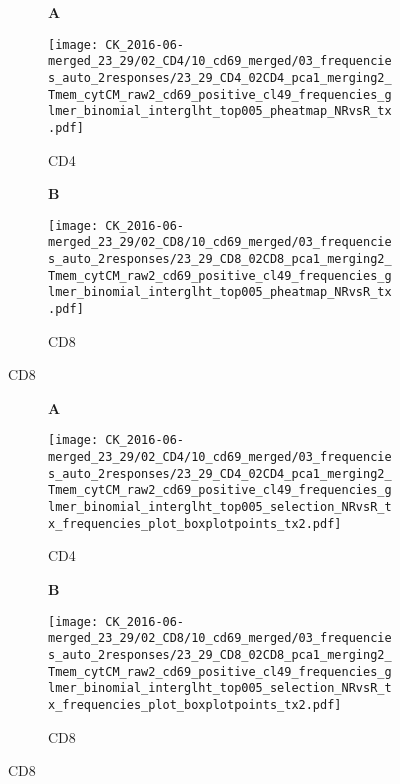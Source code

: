 \documentclass[a4paper, 12pt]{article}
\begin{document}
\clearpage

\begin{figure}[!thb]
\centering
    \caption{Significant cytokine combinations for TX (adjusted p-value $<$ 0.05)}
    \begin{subfigure}[t]{0.02\textwidth}
    \vskip 0pt
        \textbf{\textsf{\normalsize A}}
    \end{subfigure}
    \begin{subfigure}[t]{0.45\textwidth}
    \vskip 0pt
    \caption{CD4}
        \texttt{[image: CK\_2016-06-merged\_23\_29/02\_CD4/10\_cd69\_merged/03\_frequencies\_auto\_2responses/23\_29\_CD4\_02CD4\_pca1\_merging2\_Tmem\_cytCM\_raw2\_cd69\_positive\_cl49\_frequencies\_glmer\_binomial\_interglht\_top005\_pheatmap\_NRvsR\_tx.pdf]}
    \end{subfigure}
\quad
    \begin{subfigure}[t]{0.02\textwidth}
    \vskip 0pt
        \textbf{\textsf{\normalsize B}}
    \end{subfigure}
    \begin{subfigure}[t]{0.45\textwidth}
    \vskip 0pt
    \caption{CD8}
        \texttt{[image: CK\_2016-06-merged\_23\_29/02\_CD8/10\_cd69\_merged/03\_frequencies\_auto\_2responses/23\_29\_CD8\_02CD8\_pca1\_merging2\_Tmem\_cytCM\_raw2\_cd69\_positive\_cl49\_frequencies\_glmer\_binomial\_interglht\_top005\_pheatmap\_NRvsR\_tx.pdf]}
    \end{subfigure}
    
    
\end{figure}


\begin{figure}[!thb]
\centering

    \caption{}
    \begin{subfigure}[t]{0.02\textwidth}
    \vskip 0pt
        \textbf{\textsf{\normalsize A}}
    \end{subfigure}
    \begin{subfigure}[t]{0.45\textwidth}
    \vskip 0pt
    \caption{CD4}
        \texttt{[image: CK\_2016-06-merged\_23\_29/02\_CD4/10\_cd69\_merged/03\_frequencies\_auto\_2responses/23\_29\_CD4\_02CD4\_pca1\_merging2\_Tmem\_cytCM\_raw2\_cd69\_positive\_cl49\_frequencies\_glmer\_binomial\_interglht\_top005\_selection\_NRvsR\_tx\_frequencies\_plot\_boxplotpoints\_tx2.pdf]}
    \end{subfigure}
\quad
    \begin{subfigure}[t]{0.02\textwidth}
    \vskip 0pt
        \textbf{\textsf{\normalsize B}}
    \end{subfigure}
    \begin{subfigure}[t]{0.45\textwidth}
    \vskip 0pt
    \caption{CD8}
        \texttt{[image: CK\_2016-06-merged\_23\_29/02\_CD8/10\_cd69\_merged/03\_frequencies\_auto\_2responses/23\_29\_CD8\_02CD8\_pca1\_merging2\_Tmem\_cytCM\_raw2\_cd69\_positive\_cl49\_frequencies\_glmer\_binomial\_interglht\_top005\_selection\_NRvsR\_tx\_frequencies\_plot\_boxplotpoints\_tx2.pdf]}
    \end{subfigure}
    
\end{figure}
\end{document}
